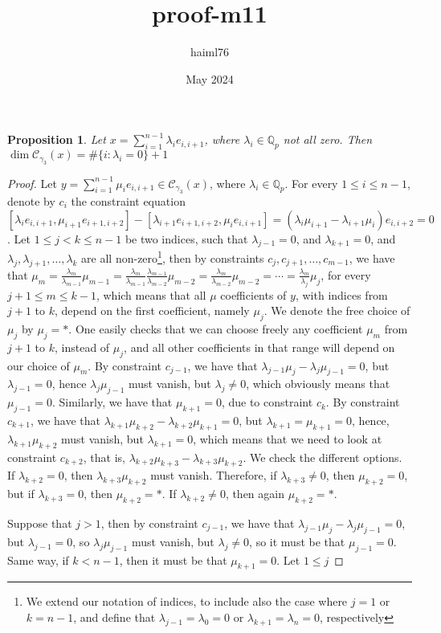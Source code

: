 \documentclass[12pt]{article}
\title{proof-m11}
\author{haiml76 }
\date{May 2024}
\newtheorem{proposition}[theorem]{Proposition}
\begin{document}
\begin{proposition}
Let $x=\sum_{i=1}^{n-1}\lambda_i e_{i,i+1}$, where $\lambda_i\in\mathbb{Q}_p$ not all zero. Then $\dim\mathcal{C}_{\gamma_3}(x)=\#\{i : \lambda_i=0\}+1$
\end{proposition}
\begin{proof}
Let $y=\sum_{i=1}^{n-1}\mu_i e_{i,i+1}\in\mathcal{C}_{\gamma_3}(x)$, where $\lambda_i\in\mathbb{Q}_p$.
For every $1\leq i\leq n-1$, denote by $c_i$ the constraint equation $[\lambda_i e_{i,i+1},\mu_{i+1}e_{i+1,i+2}]-[\lambda_{i+1}e_{i+1,i+2},\mu_i e_{i,i+1}]=(\lambda_i\mu_{i+1}-\lambda_{i+1}\mu_i)e_{i,i+2}=0$. Let $1\leq j<k\leq n-1$ be two indices, such that $\lambda_{j-1}=0$, and $\lambda_{k+1}=0$, and $\lambda_j,\lambda_{j+1},\dots,\lambda_k$ are all non-zero\footnote{We extend our notation of indices, to include also the case where $j=1$ or $k=n-1$, and define that $\lambda_{j-1}=\lambda_0=0$ or $\lambda_{k+1}=\lambda_n=0$, respectively}, then by constraints $c_j,c_{j+1},\dots,c_{m-1}$, we have that $\mu_m=\frac{\lambda_m}{\lambda_{m-1}}\mu_{m-1}=\frac{\lambda_m}{\lambda_{m-1}}\frac{\lambda_{m-1}}{\lambda_{m-2}}\mu_{m-2}=\frac{\lambda_m}{\lambda_{m-2}}\mu_{m-2}=\cdots=\frac{\lambda_m}{\lambda_j}\mu_j$, for every $j+1\leq m\leq k-1$, which means that all $\mu$ coefficients of $y$, with indices from $j+1$ to $k$, depend on the first coefficient, namely $\mu_j$. We denote the free choice of $\mu_j$ by $\mu_j=\ast$. One easily checks that we can choose freely any coefficient $\mu_m$ from $j+1$ to $k$, instead of $\mu_j$, and all other coefficients in that range will depend on our choice of $\mu_m$. By constraint $c_{j-1}$, we have that $\lambda_{j-1}\mu_j-\lambda_j\mu_{j-1}=0$, but $\lambda_{j-1}=0$, hence $\lambda_j\mu_{j-1}$ must vanish, but $\lambda_j\neq 0$, which obviously means that $\mu_{j-1}=0$. Similarly, we have that $\mu_{k+1}=0$, due to constraint $c_k$. By constraint $c_{k+1}$, we have that $\lambda_{k+1}\mu_{k+2}-\lambda_{k+2}\mu_{k+1}=0$, but $\lambda_{k+1}=\mu_{k+1}=0$, hence, $\lambda_{k+1}\mu_{k+2}$ must vanish, but $\lambda_{k+1}=0$, which means that we need to look at constraint $c_{k+2}$, that is, $\lambda_{k+2}\mu_{k+3}-\lambda_{k+3}\mu_{k+2}$. We check the different options.
If $\lambda_{k+2}=0$, then $\lambda_{k+3}\mu_{k+2}$ must vanish. Therefore, if $\lambda_{k+3}\neq 0$, then $\mu_{k+2}=0$, but if $\lambda_{k+3}=0$, then $\mu_{k+2}=\ast$. If $\lambda_{k+2}\neq 0$, then again $\mu_{k+2}=\ast$.



Suppose that $j>1$, then by constraint $c_{j-1}$, we have that $\lambda_{j-1}\mu_j-\lambda_j\mu_{j-1}=0$, but $\lambda_{j-1}=0$, so $\lambda_j\mu_{j-1}$ must vanish, but $\lambda_j\neq 0$, so it must be that $\mu_{j-1}=0$. Same way, if $k<n-1$, then it must be that $\mu_{k+1}=0$. Let $1\leq j$
\end{proof}
\end{document}
